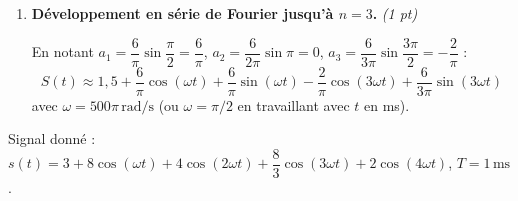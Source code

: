 \documentclass[a4paper,11pt]{article}
\newcommand{\dt}{\mathrm{d}t}
\newcommand{\reponse}[1]{\begin{tcolorbox}[reponsebox]#1\end{tcolorbox}}
\begin{document}
\begin{enumerate}[label=\textbf{\arabic*.}, itemsep=0.4cm]
  \reponse{
  \[
    b_n = \frac{2}{T}\int_0^{T} u(t)\sin(n\omega t)\,\dt
    = \frac{2}{4}\int_0^{1} 6\sin(n\omega t)\,\dt
    = 3\left[-\frac{\cos(n\omega t)}{n\omega}\right]_0^1
    = \frac{3}{n\omega}\bigl(1 - \cos(n\omega)\bigr)
  \]
  \[
    \boxed{b_n = \frac{6}{n\pi}\left(1 - \cos\!\left(\frac{n\pi}{2}\right)\right)}
  \]
  \textbf{Valeurs numériques :}
  \begin{align*}
    b_1 &= \frac{6}{\pi}\left(1 - \cos\frac{\pi}{2}\right) = \frac{6}{\pi}(1-0) = \frac{6}{\pi} \approx \mathbf{1{,}91\,\mathrm{V}}\\[4pt]
    b_2 &= \frac{6}{2\pi}\left(1 - \cos\pi\right) = \frac{6}{2\pi}(1-(-1)) = \frac{12}{2\pi} = \frac{6}{\pi} \approx \mathbf{1{,}91\,\mathrm{V}}\\[4pt]
    b_3 &= \frac{6}{3\pi}\left(1 - \cos\frac{3\pi}{2}\right) = \frac{2}{\pi}(1-0) = \frac{2}{\pi} \approx \mathbf{0{,}64\,\mathrm{V}}
  \end{align*}
  }

  \newpage

  \item \textbf{Développement en série de Fourier jusqu'à $n=3$.} \hfill\textit{(1 pt)}

  \reponse{
  En notant $a_1 = \dfrac{6}{\pi}\sin\!\dfrac{\pi}{2} = \dfrac{6}{\pi}$,\; $a_2 = \dfrac{6}{2\pi}\sin\pi = 0$,\; $a_3 = \dfrac{6}{3\pi}\sin\!\dfrac{3\pi}{2} = -\dfrac{2}{\pi}$ :
  \[
    S(t) \approx 1{,}5 + \frac{6}{\pi}\cos(\omega t) + \frac{6}{\pi}\sin(\omega t)
    - \frac{2}{\pi}\cos(3\omega t) + \frac{6}{3\pi}\sin(3\omega t)
  \]
  avec $\omega = 500\pi\,\mathrm{rad/s}$ (ou $\omega = \pi/2$ en travaillant avec $t$ en ms).
  }

\end{enumerate}


\begin{tcolorbox}[exobox={Exercice 3 \hfill \normalfont\textit{(10 points)}}]
Signal donné : $s(t) = 3 + 8\cos(\omega t) + 4\cos(2\omega t) + \dfrac{8}{3}\cos(3\omega t) + 2\cos(4\omega t)$, \; $T = 1\,\mathrm{ms}$.
\end{tcolorbox}
\end{document}
